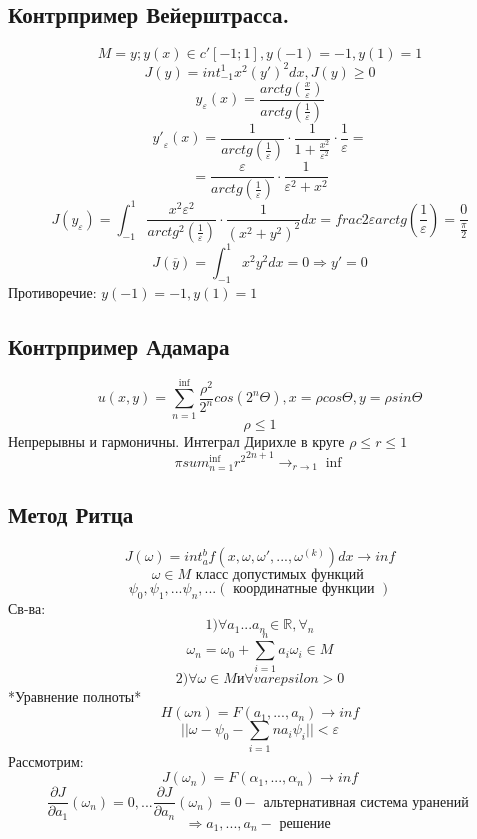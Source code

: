 \documentclass[12pt, a4paper]{article}
\begin{document}
\subsection{Контрпример Вейерштрасса. }

\[ M={y;y(x) \in c'[-1;1]}, y(-1)=-1, y(1)=1 \]
\[ J(y) = int^1_{-1} x^2{(y')}^2 dx, J(y) \geq 0 \]
\[ y_\varepsilon(x) = \frac{arctg(\frac{x}{\varepsilon})}{arctg(\frac{1}{\varepsilon})} \]
\[ {y'}_{\varepsilon}(x) = \frac{1}{arctg(\frac{1}{\varepsilon})} \cdot \frac{1}{1+ \frac{x^2}{\varepsilon^2}} \cdot \frac{1}{\varepsilon} = \]
\[ = \frac{\varepsilon} {arctg (\frac{1}{\varepsilon})} \cdot \frac{1}{\varepsilon^2+x^2} \]
\[ J(y_{\varepsilon}) = \int_{-1}^1 \frac{x^2 \varepsilon^2}{arctg^2(\frac{1}{\varepsilon})} \cdot \frac{1}{{(x^2+y^2)}^2} dx = frac{2 \varepsilon}{arctg(\frac{1}{\varepsilon})} = \frac{0}{\frac{\pi}{2}}\]
\[ J(\overline{y}) = \int_{-1}^{1} x^2 y^2 dx = 0 \Rightarrow y'=0 \]
Противоречие: $ y(-1)=-1, y(1)=1 $

\subsection{Контрпример Адамара}

\[ u(x,y) = \sum_{n=1}^{\inf}\frac{\rho^2}{2^n} cos(2^n \Theta), x=\rho cos \Theta, y=\rho sin \Theta \]
\[ \rho \leq 1 \]
Непрерывны и гармоничны.
Интеграл Дирихле в круге $ \rho \leq r \leq 1 $
\[ \pi sum_{n=1}^{\inf} {r^2}^{2n+1} {\rightarrow}_{r \rightarrow 1} \inf \]

\subsection{Метод Ритца}

\[ J(\omega) = int_{a}^{b} f(x,\omega, \omega', ... , \omega^{(k)}) dx \rightarrow inf \]
\[ \omega \in M \textrm{ класс допустимых функций } \]
\[ \psi_0, \psi_1, ... \psi_n, ... (\textrm{ координатные функции }) \]
Св-ва:
\[ 1) \forall a_1 ... a_n \in \mathbb{R}, \forall_n \]
\[ \omega_n = \omega_0+ \sum_{i=1}^{n} a_i \omega_i \in M \]
\[ 2) \forall \omega \in M\textrm{и} \forall varepsilon > 0 \]
*Уравнение полноты*
\[ H(\omega n) = F(a_1, ... , a_n) \rightarrow inf \]
\[ || \omega - \psi_0 - \sum_{i=1}{n} a_i \psi_i || < \varepsilon \]
Рассмотрим:
\[ J(\omega_n) = F(\alpha_1, ..., \alpha_n) \rightarrow inf \]
\[ \frac{\partial J}{\partial a_1}(\omega_n)=0, ... \frac{\partial J}{\partial a_n}(\omega_n) = 0 -\textrm{ альтернативная система уранений } \]
\[ \Rightarrow a_1, ... , a_n - \textrm{ решение } \]
\end{document}
